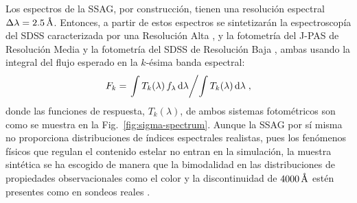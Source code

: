 Los espectros de la SSAG, por construcción, tienen una resolución espectral
$\Delta\lambda=\unit[2.5]{\AA}$. Entonces, a partir de estos espectros se sintetizarán la
espectroscopía del SDSS caracterizada por una Resolución Alta \citep[RA:
$\Delta\lambda\sim3\,\text{\AA}$][]{Strauss2002}, y la fotometría del J-PAS de Resolución Media
\citep[RM: $\Delta\lambda=100\,\text{\AA}$][]{Marin-Franch2015} y la fotometría del SDSS de
Resolución Baja \citep[RB: $\Delta\lambda\sim1000\,{\AA}$][]{Doi2010}, ambas usando la integral del
flujo esperado en la $k$-ésima banda espectral:
%
\begin{equation}\label{ec:flujo-esperado}
F_k = \left.\int T_k(\lambda)\,f_\lambda\,\text{d}\lambda\middle/\int T_k(\lambda)\,\text{d}\lambda\right.,
\end{equation}
%
donde las funciones de respuesta, $T_k(\lambda)$, de ambos sistemas fotométricos son como se muestra
en la Fig.~\ref{fig:sigma-spectrum}. Aunque la SSAG por sí misma no proporciona distribuciones de
índices espectrales realistas, pues los fenómenos físicos que regulan el contenido estelar no entran
en la simulación, la muestra sintética se ha escogido de manera que la bimodalidad en las
distribuciones de propiedades observacionales como el color y la discontinuidad de
$\unit[4000]{\AA}$ estén presentes como en sondeos reales \citep{Strateva2001, Kauffmann2003,
Baldry2004}.

